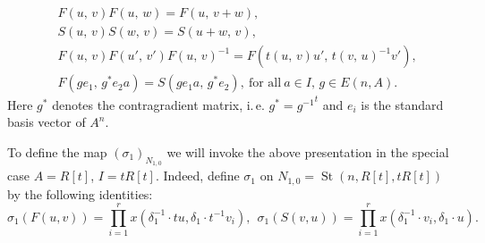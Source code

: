 \documentclass[oneside, 10pt]{amsart}
\DeclareMathOperator{\St}{St}
\numberwithin{equation}{section}
\numberwithin{lemma}{section}
\theoremstyle{definition}
\theoremstyle{remark}
\begin{document}
\begin{align}
&F(u,\,v)F(u,\,w)=F(u,\,v+w), \label{add4}\\
&S(u,\,v)S(w,\,v)=S(u+w,\,v), \label{add5}\\
&F(u,\,v)F(u',\,v')F(u,\,v)^{-1}=F(t(u,\,v)u',\,t(v,\,u)^{-1} v'), \label{conj3} \\
&F(ge_1,\,g^*e_2a)=S(ge_1a,\,g^*e_2),\ \text{for all}\ a\in I,\, g \in E(n, A).
\end{align}
Here $g^*$ denotes the contragradient matrix, i.\,e. $g^* = {g^{-1}}^t$ and $e_i$ is the standard basis vector of $A^n$.

\setcounter{equation}{3}
\renewcommand{\theequation}{\arabic{equation}}

To define the map $(\sigma_1)_{N_{1,0}}$ we will invoke the above presentation in the special case $A=R[t]$, $I=tR[t]$.
Indeed, define $\sigma_1$ on $N_{1,0}=\St(n, R[t], tR[t])$ by the following identities: 
\begin{equation}
 \sigma_1(F(u, v)) = \prod\limits_{i=1}^r x(\delta_1^{-1} \cdot t u, \delta_1 \cdot t^{-1} v_i),\ \
 \sigma_1(S(v, u)) = \prod\limits_{i=1}^r x(\delta_1^{-1} \cdot v_i, \delta_1 \cdot u).
\end{equation}
\end{document}
